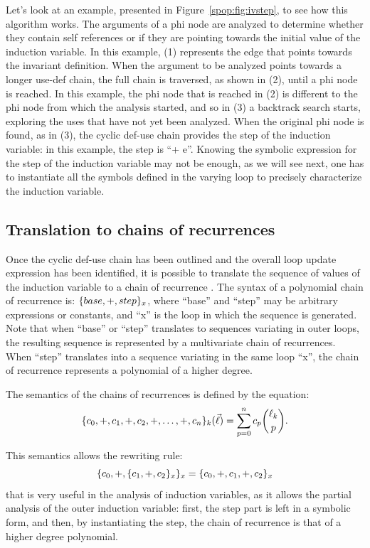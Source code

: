 Let's look at an example, presented in Figure~\ref{spop:fig:ivstep},
to see how this algorithm works.  The arguments of a phi node are
analyzed to determine whether they contain self references or if they
are pointing towards the initial value of the induction variable.  In
this example, (1) represents the edge that points towards the
invariant definition.  When the argument to be analyzed points towards
a longer use-def chain, the full chain is traversed, as shown in (2),
until a phi node is reached.  In this example, the phi node that is
reached in (2) is different to the phi node from which the analysis
started, and so in (3) a backtrack search starts, exploring the uses
that have not yet been analyzed.  When the original phi node is found,
as in (3), the cyclic def-use chain provides the step of the induction
variable: in this example, the step is ``+ e''.  Knowing the symbolic
expression for the step of the induction variable may not be enough,
as we will see next, one has to instantiate all the symbols defined in
the varying loop to precisely characterize the induction variable.

\subsection{Translation to chains of recurrences}

Once the cyclic def-use chain has been outlined and the overall loop
update expression has been identified, it is possible to translate the
sequence of values of the induction variable to a chain of recurrence
\cite{BWZ94,KMZ98,Zim01}.  The syntax of a polynomial chain of
recurrence is: $\{base, +, step\}_x$, where ``base'' and ``step''
may be arbitrary expressions or constants, and ``x'' is the loop in
which the sequence is generated.  Note that when ``base'' or ``step''
translates to sequences variating in outer loops, the resulting
sequence is represented by a multivariate chain of recurrences.  When
``step'' translates into a sequence variating in the same loop ``x'',
the chain of recurrence represents a polynomial of a higher degree.

The semantics of the chains of recurrences is defined by the equation:
\begin{equation*}
  \{c_0,+,c_1,+,c_2,+,\ldots,+,c_n\}_k(\vec{\ell})=
  \sum_{p=0}^{n}c_{p}\binom{\ell_k}{p}.
\end{equation*}

This semantics allows the rewriting rule:
\begin{equation*}
  \{c_0, +, \{c_1, +, c_2\}_x\}_x = \{c_0, +, c_1, +, c_2\}_x
\end{equation*}
that is very useful in the analysis of induction variables, as it
allows the partial analysis of the outer induction variable: first,
the step part is left in a symbolic form, and then, by instantiating
the step, the chain of recurrence is that of a higher degree
polynomial.

